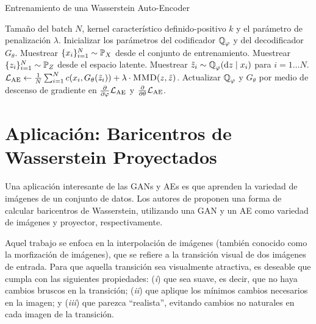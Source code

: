 \begin{algorithm}[H]
	\caption{Entrenamiento de una Wasserstein Auto-Encoder}\label{alg:WAE}
	\begin{algorithmic}[1]
		\Require Tamaño del batch $N$, kernel característico definido-positivo $k$ y el parámetro de penalización $\lambda$.
		\State{}
		\EndFunction
		\State Inicializar los parámetros del codificador $\ProbQ_\varphi$ y del decodificador $G_\theta$.
		\State Muestrear $\{x_i\}_{i=1}^{N} \sim \Prob_X$ desde el conjunto de entrenamiento.
		\State Muestrear $\{z_i\}_{i=1}^{N} \sim \Prob_Z$ desde el espacio latente.
		\State Muestrear $\tilde z_i \sim \ProbQ_\varphi(\dd z \mid x_i)$ para $i=1\dots N$.
		\State $\cL_{\mathrm{AE}} \gets \frac{1}{N}\sum_{i=1}^{N} c(x_i, G_\theta(\tilde z_i)) + \lambda \cdot \Call{MMD}{z, \tilde z}$.
		\State Actualizar $\ProbQ_\varphi$ y $G_\theta$ por medio de descenso de gradiente en $\pdv{\varphi} \cL_{\mathrm{AE}}$ y $\pdv{\theta} \mathcal{L}_{\mathrm{AE}}$.
		\EndWhile
	\end{algorithmic}
\end{algorithm}


\section{Aplicación: Baricentros de Wasserstein Proyectados}\label{sec:app-bar-wass-Proyectados}  %


Una aplicación interesante de las GANs y AEs es que aprenden la variedad de imágenes de un conjunto de datos. Los autores de \cite{simon2020barycenters} proponen una forma de calcular baricentros de Wasserstein, utilizando una GAN y un AE como variedad de imágenes y proyector, respectivamente.

Aquel trabajo se enfoca en la interpolación de imágenes (también conocido como la morfización de imágenes), que se refiere a la transición visual de dos imágenes de entrada. Para que aquella transición sea visualmente atractiva, es deseable que cumpla con las siguientes propiedades: (\textit{i}) que sea suave, es decir, que no haya cambios bruscos en la transición; (\textit{ii}) que aplique los mínimos cambios necesarios en la imagen; y (\textit{iii}) que parezca ``realista'', evitando cambios no naturales en cada imagen de la transición.

